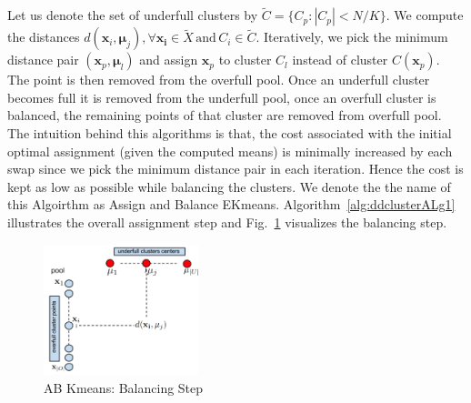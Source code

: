 Let us denote the set of underfull clusters by $\tilde{C} = \{C_p: |C_p| < N/K \} $. We compute the distances $d(\mathbf{x}_i, \boldsymbol{\mu}_j), \forall \mathbf{x_i} \in \tilde{X} \, \text{and}\, C_i \in \tilde{C}$. Iteratively, we pick the minimum distance pair $(\mathbf{x}_p,\boldsymbol{\mu}_l) $ and assign $\mathbf{x}_p$ to cluster $C_l$ instead of cluster $C(\mathbf{x}_p)$. The point is then removed from the overfull pool. Once an underfull cluster becomes full it is removed from the underfull pool, once an overfull cluster is balanced, the remaining points of that cluster are removed from overfull pool. The intuition behind this algorithms is that,  the cost associated with the initial optimal assignment (given the computed means) is minimally increased by each swap since we pick the minimum distance pair in each iteration. Hence the cost is kept as low as possible while balancing the clusters. We denote the the name of this Algoirthm as Assign and Balance EKmeans. Algorithm~\ref{alg:ddclusterALg1} illustrates the overall assignment step and Fig.~\ref{fig_ABKmeans_balancing} visualizes the balancing step.

\begin{figure} [t!]
\centering
\includegraphics[width=0.40\textwidth]{ABkmeans.png}
\caption{AB Kmeans: Balancing Step}
\label{fig_ABKmeans_balancing}
\end{figure}

